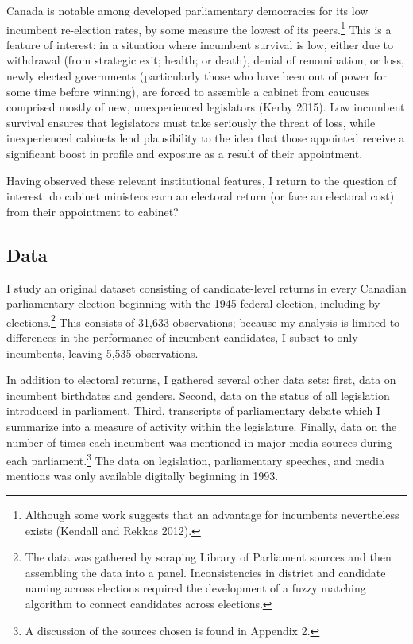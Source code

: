 \documentclass[letter,12pt]{article}
\begin{document}
Canada is notable among developed parliamentary democracies for its low incumbent re-election rates, by some measure the lowest of its peers.\footnote{Although some work suggests that an advantage for incumbents nevertheless exists (Kendall and Rekkas 2012).} This is a feature of interest: in a situation where incumbent survival is low, either due to withdrawal (from strategic exit; health; or death), denial of renomination, or loss, newly elected governments (particularly those who have been out of power for some time before winning), are forced to assemble a cabinet from caucuses comprised mostly of new, unexperienced legislators (Kerby 2015). Low incumbent survival ensures that legislators must take seriously the threat of loss, while inexperienced cabinets lend plausibility to the idea that those appointed receive a significant boost in profile and exposure as a result of their appointment.

Having observed these relevant institutional features, I return to the question of interest: do cabinet ministers earn an electoral return (or face an electoral cost) from their appointment to cabinet?

\subsection*{Data}
I study an original dataset consisting of candidate-level returns in every Canadian parliamentary election beginning with the 1945 federal election, including by-elections.\footnote{The data was gathered by scraping Library of Parliament sources and then assembling the data into a panel. Inconsistencies in district and candidate naming across elections required the development of a fuzzy matching algorithm to connect candidates across elections.} This consists of 31,633 observations; because my analysis is limited to differences in the performance of incumbent candidates, I subset to only incumbents, leaving 5,535 observations.

In addition to electoral returns, I gathered several other data sets: first, data on incumbent birthdates and genders. Second, data on the status of all legislation introduced in parliament. Third, transcripts of parliamentary debate which I summarize into a measure of activity within the legislature. Finally, data on the number of times each incumbent was mentioned in major media sources during each parliament.\footnote{A discussion of the sources chosen is found in Appendix 2.} The data on legislation, parliamentary speeches, and media mentions was only available digitally beginning in 1993.
\end{document}
